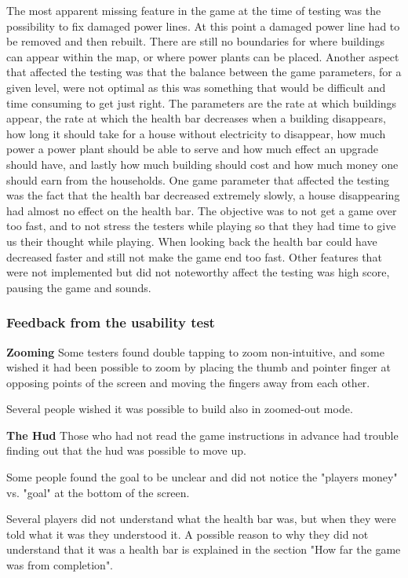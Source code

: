 	The most apparent missing feature in the game at the time of testing was the possibility 
	to fix damaged power lines. At this point a damaged power line had to be removed and then 
	rebuilt. There are still no boundaries for where buildings can appear within the map, or 
	where power plants can be placed. Another aspect that affected the testing was that the balance 
	between the game parameters, for a given level, were not optimal as this was something that 
	would be difficult and time consuming to get just right. The parameters are the rate at which 
	buildings appear, the rate at which the health bar decreases when a building disappears, 
	how long it should take for a house without electricity to disappear, how much power a power 
	plant should be able to serve and how much effect an upgrade should have, and lastly how much 
	building should cost and how much money one should earn from the households. One game parameter 
	that affected the testing was the fact that the health bar decreased extremely slowly, a house 
	disappearing had almost no effect on the health bar. The objective was to not get a game over too fast, 
	and to not stress the testers while playing so that they had time to give us their thought 
	while playing. When looking back the health bar could have decreased faster and still not 
	make the game end too fast. Other features that were not implemented but did not noteworthy 
	affect the testing was high score, pausing the game and sounds.

	\subsubsection*{Feedback from the usability test}%

		\textbf{Zooming}
			Some testers found double tapping to zoom non-intuitive, and some wished it had 
			been possible to zoom by placing the thumb and pointer finger at opposing points 
			of the screen and moving the fingers away from each other.

			Several people wished it was possible to build also in zoomed-out mode.

		\textbf{The Hud}
			Those who had not read the game instructions in advance had trouble finding out that 
			the hud was possible to move up.

			Some people found the goal to be unclear and did not notice the "players money" vs. "goal" at the bottom of the screen.

			Several players did not understand what the health bar was, but when they were told what it was they understood it. A possible reason to why they did not understand that it was a health bar is explained in the section "How far the game was from completion".


